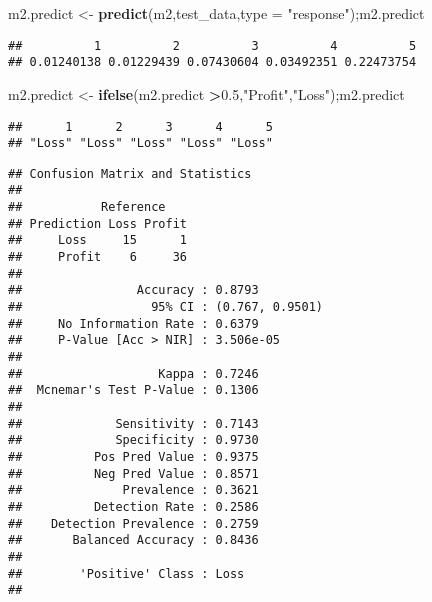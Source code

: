 \documentclass[]{article}
\newenvironment{Shaded}{\begin{snugshade}}{\end{snugshade}}
\newcommand{\KeywordTok}[1]{\textcolor[rgb]{0.13,0.29,0.53}{\textbf{#1}}}
\newcommand{\DataTypeTok}[1]{\textcolor[rgb]{0.13,0.29,0.53}{#1}}
\newcommand{\FloatTok}[1]{\textcolor[rgb]{0.00,0.00,0.81}{#1}}
\newcommand{\StringTok}[1]{\textcolor[rgb]{0.31,0.60,0.02}{#1}}
\newcommand{\CommentTok}[1]{\textcolor[rgb]{0.56,0.35,0.01}{\textit{#1}}}
\newcommand{\OperatorTok}[1]{\textcolor[rgb]{0.81,0.36,0.00}{\textbf{#1}}}
\newcommand{\NormalTok}[1]{#1}
\begin{document}
\begin{Shaded}
\begin{Highlighting}[]
\NormalTok{m2.predict <-}\StringTok{ }\KeywordTok{predict}\NormalTok{(m2,test_data,}\DataTypeTok{type =} \StringTok{"response"}\NormalTok{);m2.predict}
\end{Highlighting}
\end{Shaded}

\begin{verbatim}
##          1          2          3          4          5 
## 0.01240138 0.01229439 0.07430604 0.03492351 0.22473754
\end{verbatim}

\begin{Shaded}
\begin{Highlighting}[]
\NormalTok{m2.predict <-}\StringTok{ }\KeywordTok{ifelse}\NormalTok{(m2.predict }\OperatorTok{>}\FloatTok{0.5}\NormalTok{,}\StringTok{"Profit"}\NormalTok{,}\StringTok{"Loss"}\NormalTok{);m2.predict}
\end{Highlighting}
\end{Shaded}

\begin{verbatim}
##      1      2      3      4      5 
## "Loss" "Loss" "Loss" "Loss" "Loss"
\end{verbatim}

\begin{Shaded}
\end{Shaded}

\begin{verbatim}
## Confusion Matrix and Statistics
## 
##           Reference
## Prediction Loss Profit
##     Loss     15      1
##     Profit    6     36
##                                          
##                Accuracy : 0.8793         
##                  95% CI : (0.767, 0.9501)
##     No Information Rate : 0.6379         
##     P-Value [Acc > NIR] : 3.506e-05      
##                                          
##                   Kappa : 0.7246         
##  Mcnemar's Test P-Value : 0.1306         
##                                          
##             Sensitivity : 0.7143         
##             Specificity : 0.9730         
##          Pos Pred Value : 0.9375         
##          Neg Pred Value : 0.8571         
##              Prevalence : 0.3621         
##          Detection Rate : 0.2586         
##    Detection Prevalence : 0.2759         
##       Balanced Accuracy : 0.8436         
##                                          
##        'Positive' Class : Loss           
## 
\end{verbatim}
\end{document}
